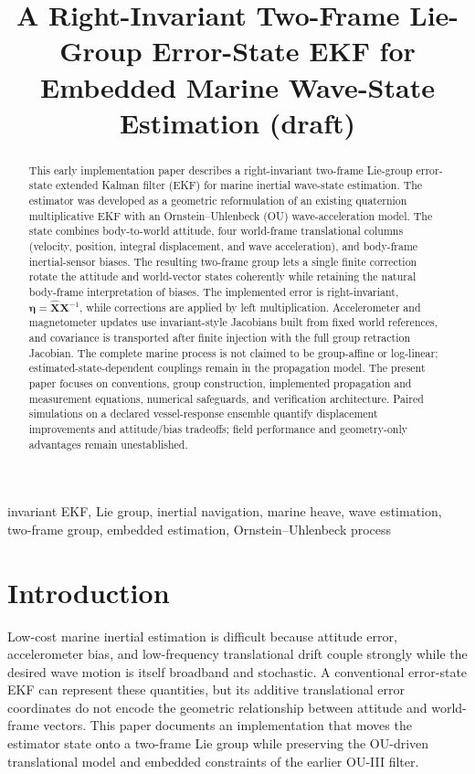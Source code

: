 \documentclass[conference]{IEEEtran}
\title{A Right-Invariant Two-Frame Lie-Group Error-State EKF for Embedded Marine Wave-State Estimation (draft)}
\author{%
  \IEEEauthorblockN{Mikhail S. Grushinskiy}
  \IEEEauthorblockA{Independent Researcher, USA, Fair Lawn\\
  Bareboat Necessities GitHub Project\\
  Email: mgrouch@users.github.com}%
}
\theoremstyle{bodysmall}
\begin{document}
\maketitle

\begin{abstract}
This early implementation paper describes a right-invariant two-frame Lie-group error-state extended Kalman filter (EKF) for marine inertial wave-state estimation. The estimator was developed as a geometric reformulation of an existing quaternion multiplicative EKF with an Ornstein--Uhlenbeck (OU) wave-acceleration model. The state combines body-to-world attitude, four world-frame translational columns (velocity, position, integral displacement, and wave acceleration), and body-frame inertial-sensor biases. The resulting two-frame group lets a single finite correction rotate the attitude and world-vector states coherently while retaining the natural body-frame interpretation of biases. The implemented error is right-invariant, $\bm{\eta}=\hat {\bm{X}} \bm{X}^{-1}$, while corrections are applied by left multiplication. Accelerometer and magnetometer updates use invariant-style Jacobians built from fixed world references, and covariance is transported after finite injection with the full group retraction Jacobian. The complete marine process is not claimed to be group-affine or log-linear; estimated-state-dependent couplings remain in the propagation model. The present paper focuses on conventions, group construction, implemented propagation and measurement equations, numerical safeguards, and verification architecture. Paired simulations on a declared vessel-response ensemble quantify displacement improvements and attitude/bias tradeoffs; field performance and geometry-only advantages remain unestablished.
\end{abstract}


\begin{IEEEkeywords}
invariant EKF, Lie group, inertial navigation, marine heave, wave estimation, two-frame group, embedded estimation, Ornstein--Uhlenbeck process
\end{IEEEkeywords}

\section{Introduction}
Low-cost marine inertial estimation is difficult because attitude error, accelerometer bias, and low-frequency translational drift couple strongly while the desired wave motion is itself broadband and stochastic. A conventional error-state EKF can represent these quantities, but its additive translational error coordinates do not encode the geometric relationship between attitude and world-frame vectors. This paper documents an implementation that moves the estimator state onto a two-frame Lie group while preserving the OU-driven translational model and embedded constraints of the earlier OU-III filter.
\end{document}
